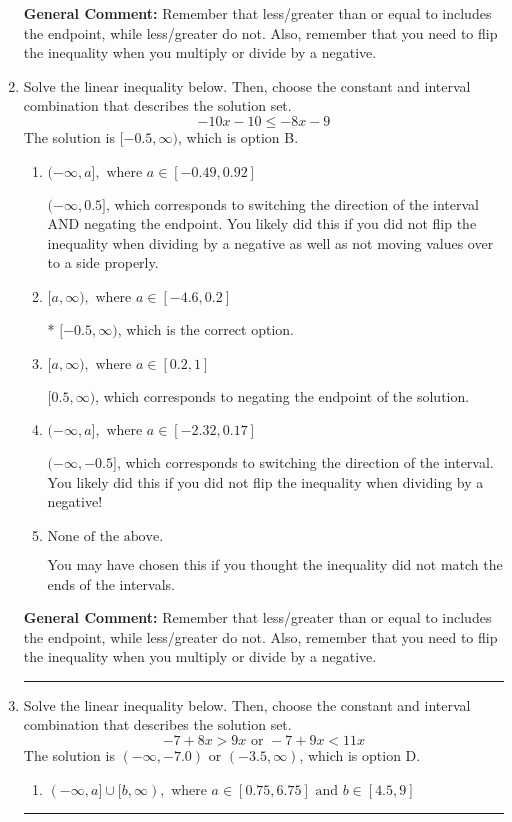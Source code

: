 \documentclass{extbook}[14pt]
\newcommand{\litem}[1]{\item #1

\rule{\textwidth}{0.4pt}}
\begin{document}
\begin{enumerate}
{\textbf{General Comment:} Remember that less/greater than or equal to includes the endpoint, while less/greater do not. Also, remember that you need to flip the inequality when you multiply or divide by a negative.
}
\litem{
Solve the linear inequality below. Then, choose the constant and interval combination that describes the solution set.
\[ -10x -10 \leq -8x -9 \]The solution is \( [-0.5, \infty) \), which is option B.\begin{enumerate}[label=\Alph*.]
\item \( (-\infty, a], \text{ where } a \in [-0.49, 0.92] \)

 $(-\infty, 0.5]$, which corresponds to switching the direction of the interval AND negating the endpoint. You likely did this if you did not flip the inequality when dividing by a negative as well as not moving values over to a side properly.
\item \( [a, \infty), \text{ where } a \in [-4.6, 0.2] \)

* $[-0.5, \infty)$, which is the correct option.
\item \( [a, \infty), \text{ where } a \in [0.2, 1] \)

 $[0.5, \infty)$, which corresponds to negating the endpoint of the solution.
\item \( (-\infty, a], \text{ where } a \in [-2.32, 0.17] \)

 $(-\infty, -0.5]$, which corresponds to switching the direction of the interval. You likely did this if you did not flip the inequality when dividing by a negative!
\item \( \text{None of the above}. \)

You may have chosen this if you thought the inequality did not match the ends of the intervals.
\end{enumerate}

\textbf{General Comment:} Remember that less/greater than or equal to includes the endpoint, while less/greater do not. Also, remember that you need to flip the inequality when you multiply or divide by a negative.
}
\litem{
Solve the linear inequality below. Then, choose the constant and interval combination that describes the solution set.
\[ -7 + 8 x > 9 x \text{ or } -7 + 9 x < 11 x \]The solution is \( (-\infty, -7.0) \text{ or } (-3.5, \infty) \), which is option D.\begin{enumerate}[label=\Alph*.]
\item \( (-\infty, a] \cup [b, \infty), \text{ where } a \in [0.75, 6.75] \text{ and } b \in [4.5, 9] \)


\end{enumerate}}
\end{enumerate}
\end{document}
